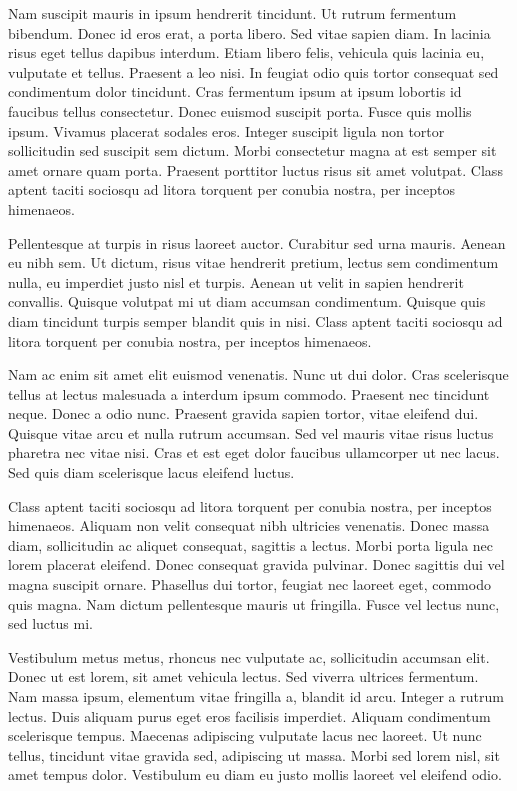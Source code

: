 Nam suscipit mauris in ipsum hendrerit tincidunt. Ut rutrum fermentum
bibendum. Donec id eros erat, a porta libero. Sed vitae sapien diam.
In lacinia risus eget tellus dapibus interdum. Etiam libero felis,
vehicula quis lacinia eu, vulputate et tellus. Praesent a leo nisi.
In feugiat odio quis tortor consequat sed condimentum dolor tincidunt.
Cras fermentum ipsum at ipsum lobortis id faucibus tellus consectetur.
Donec euismod suscipit porta. Fusce quis mollis ipsum. Vivamus placerat
sodales eros. Integer suscipit ligula non tortor sollicitudin sed
suscipit sem dictum. Morbi consectetur magna at est semper sit amet
ornare quam porta. Praesent porttitor luctus risus sit amet volutpat.
Class aptent taciti sociosqu ad litora torquent per conubia nostra,
per inceptos himenaeos.

Pellentesque at turpis in risus laoreet auctor. Curabitur sed urna
mauris. Aenean eu nibh sem. Ut dictum, risus vitae hendrerit pretium,
lectus sem condimentum nulla, eu imperdiet justo nisl et turpis. Aenean
ut velit in sapien hendrerit convallis. Quisque volutpat mi ut diam
accumsan condimentum. Quisque quis diam tincidunt turpis semper blandit
quis in nisi. Class aptent taciti sociosqu ad litora torquent per
conubia nostra, per inceptos himenaeos.

Nam ac enim sit amet elit euismod venenatis. Nunc ut dui dolor. Cras
scelerisque tellus at lectus malesuada a interdum ipsum commodo. Praesent
nec tincidunt neque. Donec a odio nunc. Praesent gravida sapien tortor,
vitae eleifend dui. Quisque vitae arcu et nulla rutrum accumsan. Sed
vel mauris vitae risus luctus pharetra nec vitae nisi. Cras et est
eget dolor faucibus ullamcorper ut nec lacus. Sed quis diam scelerisque
lacus eleifend luctus.

Class aptent taciti sociosqu ad litora torquent per conubia nostra,
per inceptos himenaeos. Aliquam non velit consequat nibh ultricies
venenatis. Donec massa diam, sollicitudin ac aliquet consequat, sagittis
a lectus. Morbi porta ligula nec lorem placerat eleifend. Donec consequat
gravida pulvinar. Donec sagittis dui vel magna suscipit ornare. Phasellus
dui tortor, feugiat nec laoreet eget, commodo quis magna. Nam dictum
pellentesque mauris ut fringilla. Fusce vel lectus nunc, sed luctus
mi.

Vestibulum metus metus, rhoncus nec vulputate ac, sollicitudin accumsan
elit. Donec ut est lorem, sit amet vehicula lectus. Sed viverra ultrices
fermentum. Nam massa ipsum, elementum vitae fringilla a, blandit id
arcu. Integer a rutrum lectus. Duis aliquam purus eget eros facilisis
imperdiet. Aliquam condimentum scelerisque tempus. Maecenas adipiscing
vulputate lacus nec laoreet. Ut nunc tellus, tincidunt vitae gravida
sed, adipiscing ut massa. Morbi sed lorem nisl, sit amet tempus dolor.
Vestibulum eu diam eu justo mollis laoreet vel eleifend odio.

